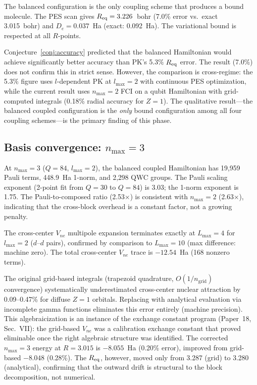 \documentclass[aps,pra,twocolumn,superscriptaddress,longbibliography]{revtex4-2}
\begin{document}
The balanced configuration is the only coupling scheme that produces a
bound molecule.  The PES scan gives $R_{\rm eq} = 3.226$~bohr (7.0\%
error vs.\ exact 3.015~bohr) and $D_e = 0.037$~Ha (exact: 0.092~Ha).
The variational bound is respected at all $R$-points.

Conjecture~\ref{conj:accuracy} predicted that the balanced Hamiltonian
would achieve significantly better accuracy than PK's 5.3\%
$R_{\rm eq}$ error.  The result (7.0\%) does not confirm this in strict
sense.  However, the comparison is cross-regime: the 5.3\% figure
uses $l$-dependent PK at $l_{\max} = 2$ with continuous PES optimization,
while the current result uses $n_{\max} = 2$ FCI on a qubit Hamiltonian
with grid-computed integrals (0.18\% radial accuracy for $Z = 1$).
The qualitative result---the balanced coupled configuration is the
\emph{only} bound configuration among all four coupling schemes---is the
primary finding of this phase.

\subsection{Basis convergence: $n_{\max} = 3$}

At $n_{\max} = 3$ ($Q = 84$, $l_{\max} = 2$), the balanced coupled
Hamiltonian has 19{,}959 Pauli terms, 448.9~Ha 1-norm, and 2{,}298 QWC
groups.  The Pauli scaling exponent (2-point fit from $Q = 30$ to
$Q = 84$) is 3.03; the 1-norm exponent is 1.75.  The
Pauli-to-composed ratio (2.53$\times$) is consistent with
$n_{\max} = 2$ (2.63$\times$), indicating that the cross-block
overhead is a constant factor, not a growing penalty.

The cross-center $V_{ne}$ multipole expansion terminates exactly at
$L_{\max} = 4$ for $l_{\max} = 2$ ($d$--$d$ pairs), confirmed by
comparison to $L_{\max} = 10$ (max difference: machine zero).  The
total cross-center $V_{ne}$ trace is $-12.54$~Ha (168 nonzero terms).

The original grid-based integrals (trapezoid quadrature,
$O(1/n_{\mathrm{grid}})$ convergence) systematically underestimated
cross-center nuclear attraction by 0.09--0.47\% for diffuse $Z = 1$
orbitals.  Replacing with analytical evaluation via incomplete gamma
functions eliminates this error entirely (machine precision).  This
algebraicization is an instance of the exchange constant program
(Paper~18, Sec.~VII): the grid-based $V_{ne}$ was a calibration
exchange constant that proved eliminable once the right algebraic
structure was identified.  The
corrected $n_{\max} = 3$ energy at $R = 3.015$ is $-8.055$~Ha (0.20\%
error), improved from grid-based $-8.048$ (0.28\%).  The $R_{\rm eq}$,
however, moved only from 3.287 (grid) to 3.280 (analytical), confirming
that the outward drift is structural to the block decomposition, not
numerical.
\end{document}
